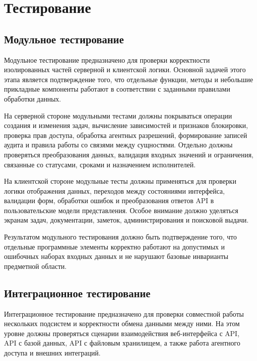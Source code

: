 \textheadingsep
\section{Тестирование}

\subsection{Модульное тестирование}

\headingtextsep

Модульное тестирование предназначено для проверки корректности изолированных частей серверной и клиентской логики. Основной задачей этого этапа является подтверждение того, что отдельные функции, методы и небольшие прикладные компоненты работают в соответствии с заданными правилами обработки данных.

На серверной стороне модульными тестами должны покрываться операции создания и изменения задач, вычисление зависимостей и признаков блокировки, проверка прав доступа, обработка агентных разрешений, формирование записей аудита и правила работы со связями между сущностями. Отдельно должны проверяться преобразования данных, валидация входных значений и ограничения, связанные со статусами, сроками и назначением исполнителей.

На клиентской стороне модульные тесты должны применяться для проверки логики отображения данных, переходов между состояниями интерфейса, валидации форм, обработки ошибок и преобразования ответов API в пользовательские модели представления. Особое внимание должно уделяться экранам задач, документации, заметок, администрирования и поисковой выдачи.

Результатом модульного тестирования должно быть подтверждение того, что отдельные программные элементы корректно работают на допустимых и ошибочных наборах входных данных и не нарушают базовые инварианты предметной области.

\textheadingsep
\subsection{Интеграционное тестирование}

\headingtextsep

Интеграционное тестирование предназначено для проверки совместной работы нескольких подсистем и корректности обмена данными между ними. На этом уровне должны проверяться сценарии взаимодействия веб-интерфейса с API, API с базой данных, API с файловым хранилищем, а также работа агентного доступа и внешних интеграций.

